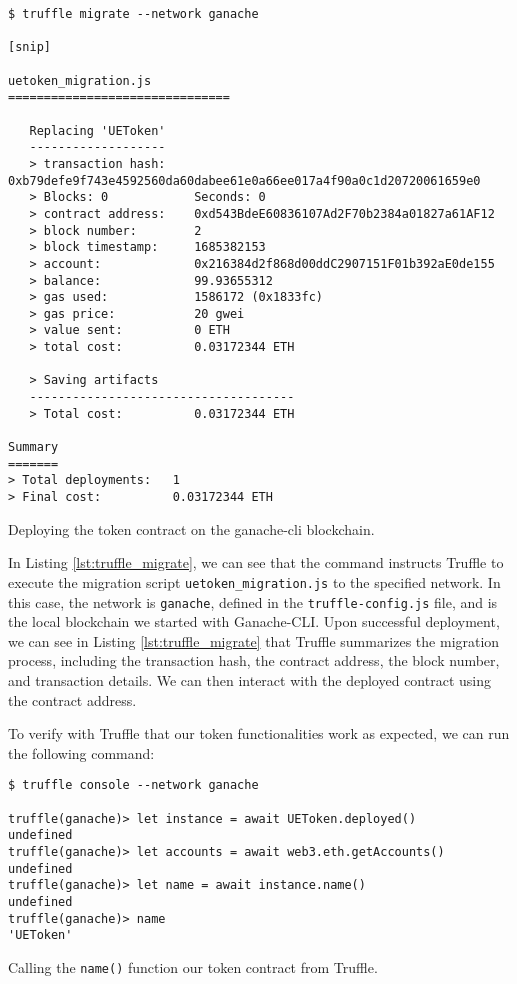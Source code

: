 \begin{listing}[H]
    \begin{verbatim}
$ truffle migrate --network ganache

[snip]

uetoken_migration.js
===============================

   Replacing 'UEToken'
   -------------------
   > transaction hash:    0xb79defe9f743e4592560da60dabee61e0a66ee017a4f90a0c1d20720061659e0
   > Blocks: 0            Seconds: 0
   > contract address:    0xd543BdeE60836107Ad2F70b2384a01827a61AF12
   > block number:        2
   > block timestamp:     1685382153
   > account:             0x216384d2f868d00ddC2907151F01b392aE0de155
   > balance:             99.93655312
   > gas used:            1586172 (0x1833fc)
   > gas price:           20 gwei
   > value sent:          0 ETH
   > total cost:          0.03172344 ETH

   > Saving artifacts
   -------------------------------------
   > Total cost:          0.03172344 ETH

Summary
=======
> Total deployments:   1
> Final cost:          0.03172344 ETH
    \end{verbatim}
    \caption{Deploying the token contract on the ganache-cli blockchain.}
    \label{lst:truffle_migrate}
\end{listing}


In Listing \ref{lst:truffle_migrate}, we can see that the command instructs Truffle to execute the migration script \texttt{uetoken\_migration.js}
to the specified network. In this case, the network is \texttt{ganache}, defined in the \texttt{truffle-config.js} file, and is the local
blockchain we started with Ganache-CLI. Upon successful deployment, we can see in Listing \ref{lst:truffle_migrate} that Truffle summarizes the migration
process, including the transaction hash, the contract address, the block number, and transaction details. We can then interact with the deployed contract
using the contract address.

To verify with Truffle that our token functionalities work as expected, we can run the following command:

\begin{listing}[H]
    \begin{verbatim}
$ truffle console --network ganache

truffle(ganache)> let instance = await UEToken.deployed()
undefined
truffle(ganache)> let accounts = await web3.eth.getAccounts()
undefined
truffle(ganache)> let name = await instance.name()
undefined
truffle(ganache)> name
'UEToken'
    \end{verbatim}
    \caption{Calling the \texttt{name()} function our token contract from Truffle.}
    \label{lst:truffle_balanceof}
\end{listing}

